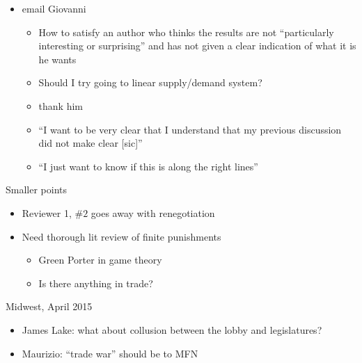 \documentclass[12pt]{article}
\begin{document}
\begin{itemize}
	\item email Giovanni
		\begin{itemize}
			\item How to satisfy an author who thinks the results are not ``particularly interesting or surprising'' and has not given a clear indication of what it is he wants
			\item Should I try going to linear supply/demand system?
			\item thank him
			\item ``I want to be very clear that I understand that my previous discussion did not make clear [sic]''
			\item ``I just want to know if this is along the right lines''
		\end{itemize}
\end{itemize}

\vskip1in
Smaller points
\begin{itemize}
	\item Reviewer 1, $\#2$ goes away with renegotiation
	\item Need thorough lit review of finite punishments
		\begin{itemize}
			\item Green Porter in game theory
			\item Is there anything in trade?
		\end{itemize}
\end{itemize}


\vskip1in
Midwest, April 2015
\begin{itemize}
	\item James Lake: what about collusion between the lobby and legislatures?
	\item Maurizio: ``trade war'' should be to MFN
\end{itemize}
\end{document}
